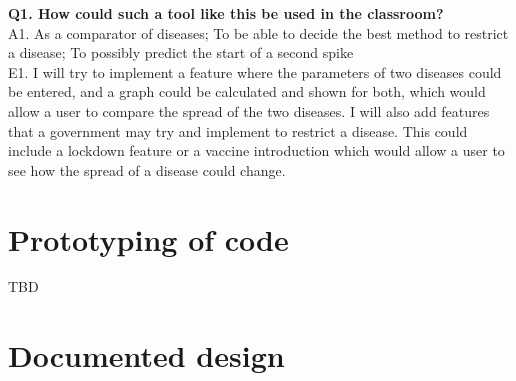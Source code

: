 \documentclass[11pt, a4paper]{article}
\begin{document}
\textbf{Q1. How could such a tool like this be used in the classroom?}\\
A1. As a comparator of diseases; To be able to decide the best method to restrict a disease; To possibly predict the start of a second spike\\
E1. I will try to implement a feature where the parameters of two diseases could be entered, and a graph could be calculated and shown for both, which would allow a user to compare the spread of the two diseases. I will also add features that a government may try and implement to restrict a disease. This could include a lockdown feature or a vaccine introduction which would allow a user to see how the spread of a disease could change.


\newpage
\section{Prototyping of code}
TBD


\newpage
\section{Documented design}
\end{document}
